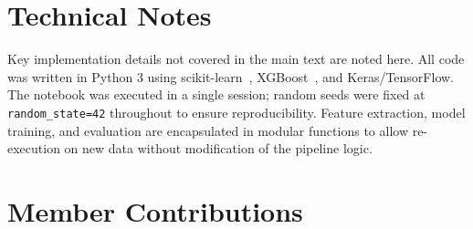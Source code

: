 \documentclass[12pt,a4paper]{cibb}
\begin{document}
\footnotesize


\normalsize

\appendix

\section{Technical Notes}
\label{app:technical}

Key implementation details not covered in the main text are noted here. All code was written in Python 3 using scikit-learn~\cite{scikit-learn}, XGBoost~\cite{chen2016xgboost}, and Keras/TensorFlow. The notebook was executed in a single session; random seeds were fixed at \texttt{random\_state=42} throughout to ensure reproducibility. Feature extraction, model training, and evaluation are encapsulated in modular functions to allow re-execution on new data without modification of the pipeline logic.

\section{Member Contributions}
\label{app:contributions}
\end{document}
